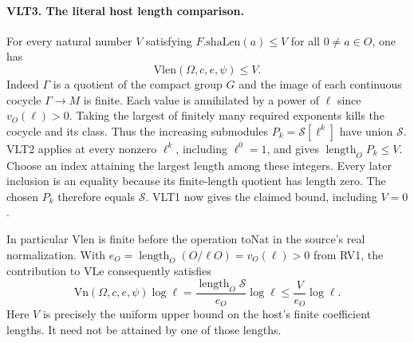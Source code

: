 \paragraph{VLT3. The literal host length comparison.}
\label{claim:VLT3}
For every natural number $V$ satisfying
$F.\mathrm{shaLen}(a)\le V$ for all $0\ne a\in O$, one has
\[
  \mathrm{Vlen}(\Omega,c,e,\psi)\le V.
\]
Indeed $\Gamma$ is a quotient of the compact group $G$ and the image
of each continuous cocycle $\Gamma\to M$ is finite. Each value is
annihilated by a power of $\ell$ since $v_O(\ell)>0$. Taking the
largest of finitely many required exponents kills the cocycle and its
class. Thus the increasing submodules $P_k=\mathcal S[\ell^k]$ have
union $\mathcal S$. VLT2 applies at every nonzero $\ell^k$, including
$\ell^0=1$, and gives $\operatorname{length}_O P_k\le V$. Choose an
index attaining the largest length among these integers. Every later
inclusion is an equality because its finite-length quotient has
length zero. The chosen $P_k$ therefore equals $\mathcal S$. VLT1
now gives the claimed bound, including $V=0$.

In particular $\mathrm{Vlen}$ is finite before the operation
$\mathrm{toNat}$ in the source's real normalization.
With $e_O=\operatorname{length}_O(O/\ell O)=v_O(\ell)>0$ from RV1,
the contribution to $\mathrm{VLe}$ consequently satisfies
\[
   \mathrm{Vn}(\Omega,c,e,\psi)\log\ell
      =\frac{\operatorname{length}_O\mathcal S}{e_O}\log\ell
      \le \frac{V}{e_O}\log\ell .
\]
Here $V$ is precisely the uniform upper bound on the host's finite
coefficient lengths. It need not be attained by one of those lengths.
